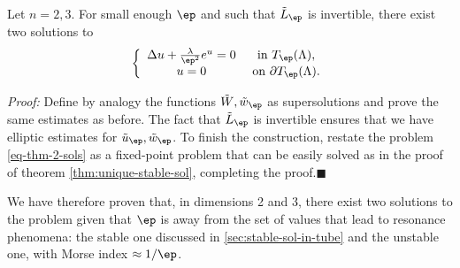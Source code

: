 \begin{theorem}
    Let $n=2,3$. For small enough $\ep$ and such that $\tilde L_\ep$ is
    invertible, there exist two solutions to
    \begin{equation}
        \label{eq-thm-2-sols}
        \left\{
            \begin{array}{cc}
                \Delta u + \frac{\lambda}{\ep^2} e^u = 0 & \mbox{ in
                }T_\ep(\Lambda),\\
                    u=0 & \mbox{ on }\partial T_\ep(\Lambda).
                \end{array}
                \right.
    \end{equation}
    \end{theorem}
    \textit{Proof: } Define by analogy the functions $\tilde W, \tilde w_\ep$
    as supersolutions and prove the same estimates as before. The fact that
    $\tilde L_\ep$ is invertible ensures that we have elliptic estimates for
    $\tilde u_\ep, \tilde w_\ep$. To finish the construction, restate the
    problem \ref{eq-thm-2-sols} as a fixed-point problem that can be easily
    solved as in the proof of theorem \ref{thm:unique-stable-sol}, completing
    the proof.\hfill $\blacksquare$

    
    
    

    We have therefore proven that, in dimensions 2 and 3, there exist two
    solutions to the problem given that $\ep$ is away from the set of values
    that lead to resonance phenomena: the stable one discussed in
    \ref{sec:stable-sol-in-tube} and the unstable one, with Morse index
    $\approx 1/\ep$.
